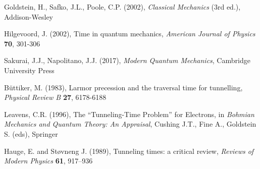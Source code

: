 \documentclass{article}
\begin{document}
\begin{thebibliography}{100}
Goldstein, H., Safko, J.L., Poole, C.P. (2002), \textit{Classical Mechanics} (3rd ed.), Addison-Wesley

Hilgevoord, J. (2002), Time in quantum mechanics, \textit{American Journal of Physics} \textbf{70}, 301-306

Sakurai, J.J., Napolitano, J.J. (2017), \textit{Modern Quantum Mechanics}, Cambridge University Press

B{\"u}ttiker, M. (1983), Larmor precession and the traversal time for tunnelling, \textit{Physical Review B} \textbf{27}, 6178-6188

Leavens, C.R. (1996), The “Tunneling-Time Problem” for Electrons, in \textit{Bohmian Mechanics and Quantum Theory: An Appraisal}, Cushing J.T., Fine A., Goldstein S. (eds), Springer

Hauge, E. and St{\o}vneng J. (1989), Tunneling times: a critical review, \textit{Reviews of Modern Physics} \textbf{61}, 917–936



\end{thebibliography}
\end{document}
